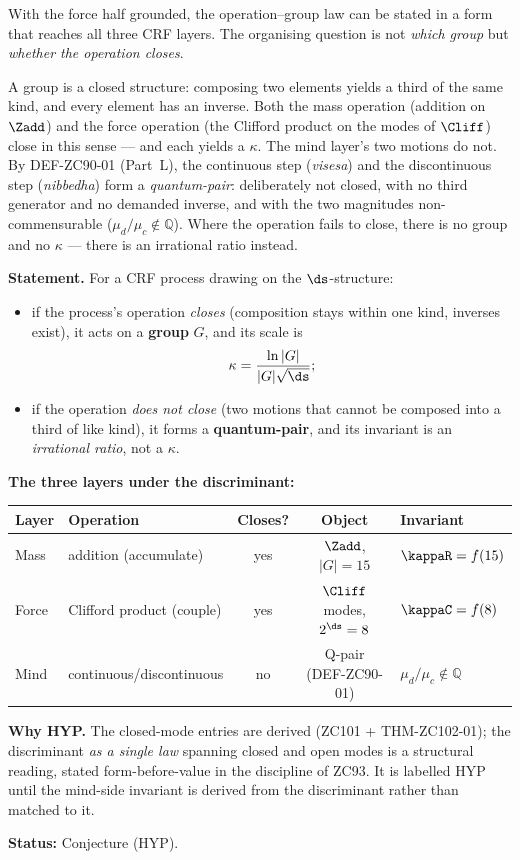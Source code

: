 \documentclass[12pt, a4paper]{article}
\begin{document}
With the force half grounded, the operation--group law can be stated in a form
that reaches all three CRF layers. The organising question is not \emph{which
group} but \emph{whether the operation closes}.

A group is a closed structure: composing two elements yields a third of the same
kind, and every element has an inverse. Both the mass operation (addition on
$\Zadd$) and the force operation (the Clifford product on the modes of $\Cliff$)
close in this sense --- and each yields a $\kappa$. The mind layer's two motions
do not. By DEF-ZC90-01 (Part~L), the continuous step (\emph{visesa}) and the
discontinuous step (\emph{nibbedha}) form a \emph{quantum-pair}: deliberately
not closed, with no third generator and no demanded inverse, and with the two
magnitudes non-commensurable ($\mu_d/\mu_c\notin\mathbb{Q}$). Where the operation
fails to close, there is no group and no $\kappa$ --- there is an irrational
ratio instead.

\begin{derivedbox}[title={CONJ-ZC102-01: Closure Selects Group-or-Q-pair (HYP)}]

\textbf{Statement.} For a CRF process drawing on the $\ds$-structure:
\begin{itemize}[leftmargin=2em, noitemsep]
  \item if the process's operation \emph{closes} (composition stays within one
    kind, inverses exist), it acts on a \textbf{group} $G$, and its scale is
    \[
      \kappa = \frac{\ln|G|}{|G|\sqrt{\ds}};
    \]
  \item if the operation \emph{does not close} (two motions that cannot be
    composed into a third of like kind), it forms a \textbf{quantum-pair}, and
    its invariant is an \emph{irrational ratio}, not a $\kappa$.
\end{itemize}

\textbf{The three layers under the discriminant:}
\begin{center}
{\small\renewcommand{\arraystretch}{1.3}
\begin{tabular}{@{}llccl@{}}
\toprule
Layer & Operation & Closes? & Object & Invariant \\
\midrule
Mass  & addition (accumulate)        & yes & $\Zadd$, $|G|=15$        & $\kappaR=f(15)$ \\
Force & Clifford product (couple)    & yes & $\Cliff$ modes, $2^{\ds}=8$ & $\kappaC=f(8)$ \\
Mind  & continuous/discontinuous     & no  & Q-pair (DEF-ZC90-01)     & $\mu_d/\mu_c\notin\mathbb{Q}$ \\
\bottomrule
\end{tabular}}
\end{center}

\textbf{Why HYP.} The closed-mode entries are derived (ZC101 + THM-ZC102-01);
the discriminant \emph{as a single law} spanning closed and open modes is a
structural reading, stated form-before-value in the discipline of ZC93. It is
labelled HYP until the mind-side invariant is derived from the discriminant
rather than matched to it.

\textbf{Status:} Conjecture (HYP).
\end{derivedbox}
\end{document}
